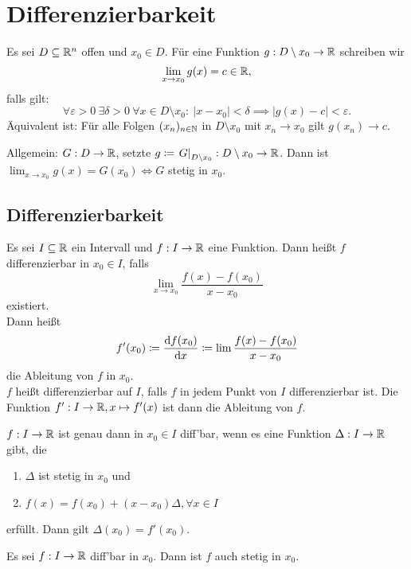 \section{Differenzierbarkeit}
Es sei $D\subseteq \mathbb{R}^n$ offen und $x_0\in D$. Für eine Funktion $g:D\setminus {x_0}\to \mathbb{R}$ schreiben wir
\[
\lim_{x\to x_0} g(x) = c\in \mathbb{R},
\]
falls gilt:
\[
\forall \varepsilon>0\ \exists \delta > 0\ \forall x\in D\setminus {x_0}:\ \vert x-x_0 \vert <\delta \implies \vert g(x)-c \vert<\varepsilon.
\]
Äquivalent ist: Für alle Folgen $(x_n)_{n\in\mathbb{N}}$ in $D\setminus{x_0}$ mit $x_n\to x_0$ gilt $g(x_n)\to c$.

\begin{bem}
    Allgemein:
    $G:D\to \mathbb{R}$, setzte $g\coloneqq \left. G\right|_{D\setminus {x_0}}:D\setminus {x_0}\to \mathbb{R}$. Dann ist
    $\lim_{x\to x_0}g(x)=G(x_0) \iff G$ stetig in $x_0$.
\end{bem}
\subsection{Differenzierbarkeit}
\begin{defn} Es sei $I\subseteq \mathbb{R}$ ein Intervall und $f:I\to \mathbb{R}$ eine Funktion. Dann heißt $f$ differenzierbar in $x_0\in I$,
    falls
    \[
        \lim_{x\to x_0} \frac{f(x)-f(x_0)}{x-x_0}
    \] existiert.\\
    Dann heißt
    \[
        f'(x_0)\coloneqq \frac{\mathrm{d} f(x_0)}{\mathrm{d} x}\coloneqq \lim \frac{f(x)-f(x_0)}{x-x_0}
    \] die Ableitung von $f$ in $x_0$.\\
    $f$ heißt differenzierbar auf $I$, falls $f$ in jedem Punkt von $I$ differenzierbar ist. Die Funktion $f':I\to\mathbb{R}, x\mapsto f'(x)$
    ist dann die Ableitung von $f$.
\end{defn}
\begin{lemma} $f:I\to\mathbb{R}$ ist genau dann in $x_0\in I$ diff'bar, wenn es eine Funktion $\Delta: I\to \mathbb{R}$ gibt, die
    \begin{enumerate}[a]
        \item $\Delta$ ist stetig in $x_0$ und
        \item $f(x)=f(x_0)+(x-x_0)\Delta, \forall x\in I$
    \end{enumerate}
    erfüllt. Dann gilt $\Delta(x_0) = f'(x_0)$.
\end{lemma}
\begin{satz} Es sei $f:I\to \mathbb{R}$ diff'bar in $x_0$. Dann ist $f$ auch stetig in $x_0$.
\end{satz}

